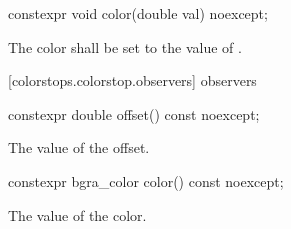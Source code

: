 \begin{itemdecl}
	constexpr void color(double val) noexcept;
\end{itemdecl}
\begin{itemdescr}
	\pnum
	\effects
	The color shall be set to the value of .
\end{itemdescr}

 [colorstops.colorstop.observers]{ observers}

\begin{itemdecl}
	constexpr double offset() const noexcept;
\end{itemdecl}
\begin{itemdescr}
	\pnum
	\returns
	The value of the offset.
\end{itemdescr}

\begin{itemdecl}
	constexpr bgra_color color() const noexcept;
\end{itemdecl}
\begin{itemdescr}
	\pnum
	\returns
	The value of the color.
\end{itemdescr}
